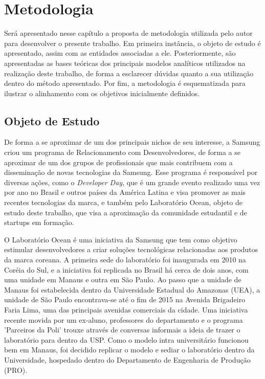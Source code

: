
\chapter{Metodologia}

Será apresentado nesse capítulo a proposta de metodologia utilizada pelo autor para desenvolver o presente trabalho. Em primeira instância,  o objeto de estudo é apresentado, assim com as entidades associadas a ele. Posteriormente, são apresentadas as bases teóricas dos principais modelos analíticos utilizados na realização deste trabalho, de forma a esclarecer dúvidas quanto a sua utilização dentro do método apresentado. Por fim, a metodologia é esquematizada para ilustrar o alinhamento com os objetivos inicialmente definidos.

\section{Objeto de Estudo}

De forma a se aproximar de um dos principais nichos de seu interesse, a Samsung criou um programa de Relacionamento com Desenvolvedores, de forma a se aproximar de um dos grupos de profissionais que mais contribuem com a disseminação de novas tecnologias da Samsung. Esse programa é responsável por diversas ações, como o \textit{Developer Day}, que é um grande evento realizado uma vez por ano no Brasil e outros países da América Latina e visa promover as mais recentes tecnologias da marca, e também pelo Laboratório Ocean, objeto de estudo deste trabalho, que visa a aproximação da comunidade estudantil e de startups em formação.

O Laboratório Ocean é uma iniciativa da Samsung que tem como objetivo estimular desenvolvedores a criar soluções tecnológicas relacionadas aos produtos da marca coreana. A primeira sede do laboratório foi inaugurada em 2010 na Coréia do Sul, e a iniciativa foi replicada no Brasil há cerca de dois anos, com uma unidade em Manaus e outra em São Paulo. Ao passo que a unidade de Manaus foi estabelecida dentro da Universidade Estadual do Amazonas (UEA), a unidade de São Paulo encontrava-se até o fim de 2015 na Avenida Brigadeiro Faria Lima, uma das principais avenidas comerciais da cidade. Uma iniciativa recente movida por um ex-aluno, professores do departamento e o programa 'Parceiros da Poli' trouxe através de conversas informais a ideia de trazer o laboratório para dentro da USP. Como o modelo intra universitário funcionou bem em Manaus, foi decidido replicar o modelo e sediar o laboratório dentro da Universidade, hospedado dentro do Departamento de Engenharia de Produção (PRO).

